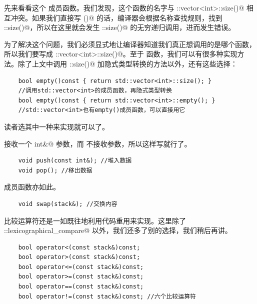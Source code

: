 先来看看这个 \lstinline@size@ 成员函数。我们发现，这个函数的名字与 \lstinline@std::vector<int>::size()@ 相互冲突。如果我们直接写 \lstinline@size()@ 的话，编译器会根据名称查找规则，找到 \lstinline@stack::size()@，所以在这里就会发生 \lstinline@stack::size()@ 的无穷递归调用，进而发生错误。\par
为了解决这个问题，我们必须显式地让编译器知道我们真正想调用的是哪个函数，所以我们要写成 \lstinline@std::vector<int>::size()@。至于 \lstinline@empty@ 函数，我们可以有很多种实现方法。除了上文中调用 \lstinline@stack::size()@ 加隐式类型转换的方法以外，还有这些选择：
\begin{lstlisting}
    bool empty()const { return std::vector<int>::size(); }
    //调用std::vector<int>的成员函数，再隐式类型转换
    bool empty()const { return std::vector<int>::empty(); }
    //std::vector<int>也有empty()成员函数，可以直接用它
\end{lstlisting}
读者选其中一种来实现就可以了。\par
\lstinline@push@ 接收一个 \lstinline@const int&@ 参数，而 \lstinline@pop@ 不接收参数，所以这样写就行了。
\begin{lstlisting}
    void push(const int&); //堆入数据
    void pop(); //移出数据
\end{lstlisting}\par
\lstinline@swap@ 成员函数亦如此。
\begin{lstlisting}
    void swap(stack&); //交换内容
\end{lstlisting}\par
比较运算符还是一如既往地利用代码重用来实现。这里除了 \lstinline@std::lexicographical_compare@ 以外，我们还多了别的选择，我们稍后再讲。
\begin{lstlisting}
    bool operator<(const stack&)const;
    bool operator>(const stack&)const;
    bool operator<=(const stack&)const;
    bool operator>=(const stack&)const;
    bool operator==(const stack&)const;
    bool operator!=(const stack&)const; //六个比较运算符
\end{lstlisting}\par

